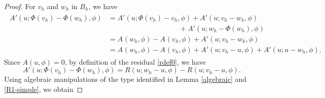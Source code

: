 \documentclass[12pt]{amsart}
\numberwithin{equation}{section}
\begin{document}
\begin{proof}
For $v_h$ and $w_h$  in $B_h$, %
we have
\begin{align*}
\begin{split}
A'(u;\Phi( v_h)- \Phi( w_h),\phi) %
&= A'(u;\Phi( v_h)-  v_h,\phi)+A'(u; v_h- w_h,\phi) \\
& \qquad \qquad \qquad \qquad \qquad  + A'(u;w_h - \Phi( w_h),\phi)\\
&= A_{}( w_h,\phi)  -A_{}( v_h,\phi) + A'(u; v_h- w_h,\phi) \\
&=  A_{}( w_h,\phi)  -A_{}( v_h,\phi) + A'(u; v_h -u,\phi) + A'(u; u - w_h,\phi).
\end{split}
\end{align*}
Since $A(u,\phi)=0$, by definition of the residual \eqref{rdef0}, we have
$$
A'(u;\Phi( v_h)- \Phi( w_h),\phi) = R(u;w_h-u,\phi) - R(u;v_h-u,\phi).
$$
Using algebraic manipulations of the type identified in Lemma \ref{algebraic} and \eqref{R1-simple}, we obtain


\end{proof}
\end{document}
